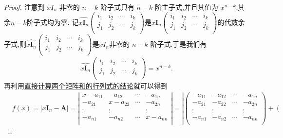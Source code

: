 \documentclass[../../main.tex]{subfiles}
\begin{document}
\begin{proof}
注意到 \(xI_{n}\) 非零的 \(n - k\) 阶子式只有 \(n - k\) 阶主子式,并且其值为 \(x^{n - k}\),其余$n-k$阶子式均为零.
记$\widehat{x\boldsymbol{I}_n}\left( \begin{matrix}
i_1&		i_2&		\cdots&		i_k\\
j_1&		j_2&		\cdots&		j_k\\
\end{matrix} \right)$是$x\boldsymbol{I}_n\left( \begin{matrix}
i_1&		i_2&		\cdots&		i_k\\
j_1&		j_2&		\cdots&		j_k\\
\end{matrix} \right)$的代数余子式,则$\widehat{x\boldsymbol{I}_n}\left( \begin{matrix}
i_1&		i_2&		\cdots&		i_k\\
j_1&		j_2&		\cdots&		j_k\\
\end{matrix} \right)$是\(xI_{n}\)非零的 \(n - k\) 阶子式.于是我们有
\begin{align*}
\widehat{x\boldsymbol{I}_n}\left( \begin{matrix}
i_1&		i_2&		\cdots&		i_k\\
j_1&		j_2&		\cdots&		j_k\\
\end{matrix} \right) =x^{n-k}.
\end{align*}
再利用\hyperref[proposition:直接计算两个矩阵和的行列式]{直接计算两个矩阵和的行列式的结论}就可以得到
\begin{align*}
&f(x)=|x\boldsymbol{I}_n-\boldsymbol{A}|=\left| \begin{matrix}
x-a_{11}&		-a_{12}&		\cdots&		-a_{1n}\\
-a_{21}&		x-a_{22}&		\cdots&		-a_{2n}\\
\vdots&		\vdots&		&		\vdots\\
-a_{n1}&		-a_{n2}&		\cdots&		x-a_{nn}\\
\end{matrix} \right|=\left| \left( \begin{matrix}
-a_{11}&		-a_{12}&		\cdots&		-a_{1n}\\
-a_{21}&		-a_{22}&		\cdots&		-a_{2n}\\
\vdots&		\vdots&		&		\vdots\\
-a_{n1}&		-a_{n2}&		\cdots&		-a_{nn}\\
\end{matrix} \right) +\left( \begin{matrix}

\end{matrix}
\end{align*}
\end{proof}
\end{document}
